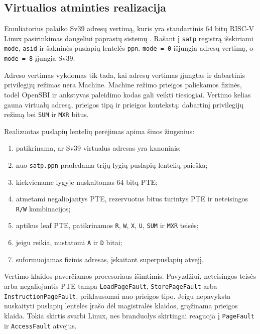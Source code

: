 \subsection{Virtualios atminties realizacija}
\label{sec:adresu-vertimas}

Emuliatorius palaiko Sv39 adresų vertimą, kuris yra standartinis 64 bitų RISC-V Linux pasirinkimas daugeliui paprastų sistemų \cite[p.~99--106]{riscv-privileged-20260120}. Rašant į \texttt{satp} registrą išskiriami \texttt{mode}, \texttt{asid} ir šakninės puslapių lentelės \texttt{ppn}. \texttt{mode = 0} išjungia adresų vertimą, o \texttt{mode = 8} įjungia Sv39.

Adreso vertimas vykdomas tik tada, kai adresų vertimas įjungtas ir dabartinis privilegijų režimas nėra Machine. Machine režimo prieigos paliekamos fizinės, todėl OpenSBI ir ankstyvas paleidimo kodas gali veikti tiesiogiai. Vertimo kelias gauna virtualų adresą, prieigos tipą ir prieigos kontekstą: dabartinį privilegijų režimą bei \texttt{SUM} ir \texttt{MXR} bitus.

Realizuotas puslapių lentelių perėjimas apima šiuos žingsnius:

\begin{enumerate}
    \item patikrinama, ar Sv39 virtualus adresas yra kanoninis;
    \item nuo \texttt{satp.ppn} pradedama trijų lygių puslapių lentelių paieška;
    \item kiekviename lygyje nuskaitomas 64 bitų PTE;
    \item atmetami negaliojantys PTE, rezervuotus bitus turintys PTE ir neteisingos \texttt{R/W} kombinacijos;
    \item aptikus leaf PTE, patikrinamos \texttt{R}, \texttt{W}, \texttt{X}, \texttt{U}, \texttt{SUM} ir \texttt{MXR} teisės;
    \item jeigu reikia, nustatomi \texttt{A} ir \texttt{D} bitai;
    \item suformuojamas fizinis adresas, įskaitant superpuslapių atvejį.
\end{enumerate}

Vertimo klaidos paverčiamos procesoriaus išimtimis. Pavyzdžiui, neteisingos teisės arba negaliojantis PTE tampa \texttt{LoadPageFault}, \texttt{StorePageFault} arba \texttt{InstructionPageFault}, priklausomai nuo prieigos tipo. Jeigu nepavyksta nuskaityti puslapių lentelės įrašo dėl magistralės klaidos, grąžinama prieigos klaida. Tokia skirtis svarbi Linux, nes branduolys skirtingai reaguoja į \texttt{PageFault} ir \texttt{AccessFault} atvejus.
